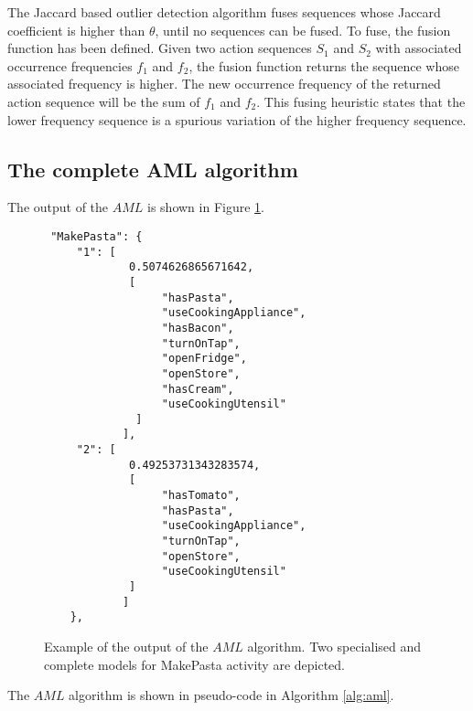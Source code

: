 The Jaccard based outlier detection algorithm fuses sequences whose Jaccard coefficient is higher than $\theta$, until no sequences can be fused. To fuse, the fusion function has been defined. Given two action sequences $S_1$ and $S_2$ with associated occurrence frequencies $f_1$ and $f_2$, the fusion function returns the sequence whose associated frequency is higher. The new occurrence frequency of the returned action sequence will be the sum of $f_1$ and $f_2$. This fusing heuristic states that the lower frequency sequence is a spurious variation of the higher frequency sequence.

\subsection{The complete AML algorithm}
\label{subsec:learner:complete}

The output of the $AML$ is shown in Figure \ref{fig-aml-output}.

\begin{figure}[htbp]
\begin{small}
\begin{lstlisting}
 "MakePasta": {
     "1": [          
             0.5074626865671642, 
             [
                  "hasPasta", 
                  "useCookingAppliance", 
                  "hasBacon", 
                  "turnOnTap", 
                  "openFridge", 
                  "openStore", 
                  "hasCream", 
                  "useCookingUtensil"
              ]
            ],
     "2": [
             0.49253731343283574, 
             [
                  "hasTomato", 
                  "hasPasta", 
                  "useCookingAppliance", 
                  "turnOnTap", 
                  "openStore", 
                  "useCookingUtensil"
             ]
            ]        
    }, 

\end{lstlisting}
\end{small}
\caption{Example of the output of the $AML$ algorithm. Two specialised and complete models for MakePasta activity are depicted.}
\label{fig-aml-output}
\end{figure}

The $AML$ algorithm is shown in pseudo-code in Algorithm \ref{alg:aml}.

